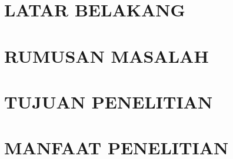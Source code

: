 \vspace{1.5pc}
\vspace{1.5pc}
\section[Latar Belakang]{LATAR BELAKANG}
\begin{spacing}{1.5}
	
\lipsum[1-4]
	
\section[Rumusan Masalah]{RUMUSAN MASALAH}

\lipsum[1-2]

\section[Tujuan Penelitian]{TUJUAN PENELITIAN}

\lipsum[1-2]

\section[Manfaat Penelitian]{MANFAAT PENELITIAN}

\lipsum[1-2]

\end{spacing}